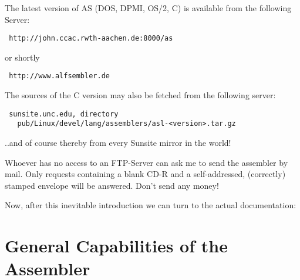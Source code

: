 \documentclass[12pt,twoside]{report}
\begin{document}
The latest version of AS (DOS, DPMI, OS/2, C) is available from
the following Server:
\begin{verbatim}
 http://john.ccac.rwth-aachen.de:8000/as
\end{verbatim}
or shortly
\begin{verbatim}
 http://www.alfsembler.de
\end{verbatim}
The sources of the C version may also be fetched from the following server:
\begin{verbatim}
 sunsite.unc.edu, directory
   pub/Linux/devel/lang/assemblers/asl-<version>.tar.gz
\end{verbatim}
..and of course thereby from every Sunsite mirror in the world!

Whoever has no access to an FTP-Server can ask me to send the assembler
by mail.  Only requests containing a blank CD-R and a self-addressed,
(correctly) stamped envelope will be answered.  Don't send any money!

Now, after this inevitable introduction we can turn to the actual
documentation:


\section{General Capabilities of the Assembler}
\end{document}
